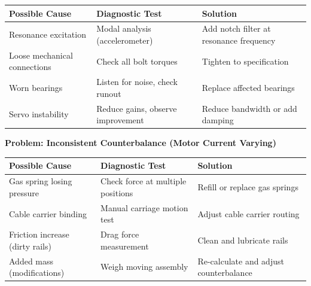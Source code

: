 \documentclass[
]{article}
\begin{document}
{\def\LTcaptype{} %
\begin{longtable}[]{@{}
  >{\raggedright\arraybackslash}p{}
  >{\raggedright\arraybackslash}p{}
  >{\raggedright\arraybackslash}p{}@{}}
\toprule\noalign{}
\begin{minipage}[b]{\linewidth}\raggedright
Possible Cause
\end{minipage} & \begin{minipage}[b]{\linewidth}\raggedright
Diagnostic Test
\end{minipage} & \begin{minipage}[b]{\linewidth}\raggedright
Solution
\end{minipage} \\
\midrule\noalign{}
\endhead
\bottomrule\noalign{}
\endlastfoot
Resonance excitation & Modal analysis (accelerometer) & Add notch filter
at resonance frequency \\
Loose mechanical connections & Check all bolt torques & Tighten to
specification \\
Worn bearings & Listen for noise, check runout & Replace affected
bearings \\
Servo instability & Reduce gains, observe improvement & Reduce bandwidth
or add damping \\
\end{longtable}
}

\textbf{Problem: Inconsistent Counterbalance (Motor Current Varying)}

{\def\LTcaptype{} %
\begin{longtable}[]{@{}
  >{\raggedright\arraybackslash}p{}
  >{\raggedright\arraybackslash}p{}
  >{\raggedright\arraybackslash}p{}@{}}
\toprule\noalign{}
\begin{minipage}[b]{\linewidth}\raggedright
Possible Cause
\end{minipage} & \begin{minipage}[b]{\linewidth}\raggedright
Diagnostic Test
\end{minipage} & \begin{minipage}[b]{\linewidth}\raggedright
Solution
\end{minipage} \\
\midrule\noalign{}
\endhead
\bottomrule\noalign{}
\endlastfoot
Gas spring losing pressure & Check force at multiple positions & Refill
or replace gas springs \\
Cable carrier binding & Manual carriage motion test & Adjust cable
carrier routing \\
Friction increase (dirty rails) & Drag force measurement & Clean and
lubricate rails \\
Added mass (modifications) & Weigh moving assembly & Re-calculate and
adjust counterbalance \\
\end{longtable}
}
\end{document}
